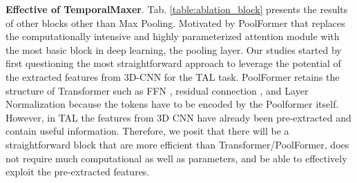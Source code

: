 \documentclass[10pt,twocolumn,letterpaper]{article}
\begin{document}
\begin{table*}[]
\centering
{}
\caption{Ablation studies about different TCM blocks on THUMOS14. Inference times are measured using an input video with 2304 clip embeddings, a 5 minutes video, on a GeForce GTX 1080 Ti GPU without post-processing (NMS) and pre-extracted features step.}
\label{table:ablation_block}
\end{table*}


\textbf{Effective of TemporalMaxer}. Tab. \ref{table:ablation_block} presents the results of other blocks other than Max Pooling.
Motivated by PoolFormer \cite{yu2022metaformer} that replaces the computationally intensive and highly parameterized attention module with the most basic block in deep learning, the pooling layer. Our studies started by first questioning the most straightforward approach to leverage the potential of the extracted features from 3D-CNN for the TAL task. PoolFormer retains the structure of Transformer such as FFN \cite{rosenblatt1961principles, rumelhart1985learning}, residual connection \cite{he2016deep}, and Layer Normalization \cite{ba2016layer} because the tokens have to be encoded by the Poolformer itself. However, in TAL the features from 3D CNN have already been pre-extracted and contain useful information. Therefore, we posit that there will be a straightforward block that are more efficient than Transformer/PoolFormer, does not require much computational as well as parameters, and be able to effectively exploit the pre-extracted features.
\end{document}
